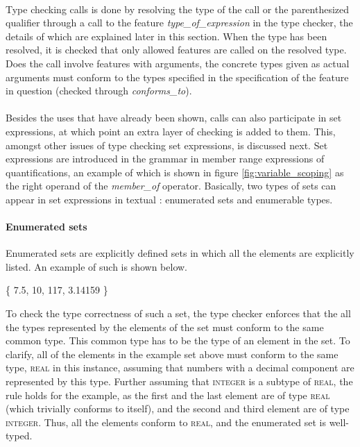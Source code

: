 \paragraph{}
Type checking calls is done by resolving the type of the call or the parenthesized qualifier through a call to the feature \textit{type\_of\_expression} in the type checker, the details of which are explained later in this section. When the type has been resolved, it is checked that only allowed features are called on the resolved type. Does the call involve features with arguments, the concrete types given as actual arguments must conform to the types specified in the specification of the feature in question (checked through \textit{conforms\_to}).
\paragraph{}
Besides the uses that have already been shown, calls can also participate in set expressions, at which point an extra layer of checking is added to them. This, amongst other issues of type checking set expressions, is discussed next.
\label{implementation-set-expressions}
Set expressions are introduced in the grammar in member range expressions of quantifications, an example of which is shown in figure \ref{fig:variable_scoping} as the right operand of the \textit{member\_of} operator. Basically, two types of sets can appear in set expressions in textual \bon{}: enumerated sets and enumerable types.
\paragraph{Enumerated sets}
Enumerated sets are explicitly defined sets in which all the elements are explicitly listed. An example of such is shown below.
{\footnotesize
\begin{center}
\{ 7.5,  10, 117, 3.14159 \}	
\end{center}}
To check the type correctness of such a set, the type checker enforces that the all the types represented by the elements of the set must conform to the same common type. This common type has to be the type of an element in the set. To clarify, all of the elements in the example set above must conform to the same type, \textsc{real} in this instance, assuming that numbers with a decimal component are represented by this type. Further assuming that \textsc{integer} is a subtype of \textsc{real}, the rule holds for the example, as the first and the last element are of type \textsc{real} (which trivially conforms to itself), and the second and third element are of type \textsc{integer}. Thus, all the elements conform to \textsc{real}, and the enumerated set is well-typed.

